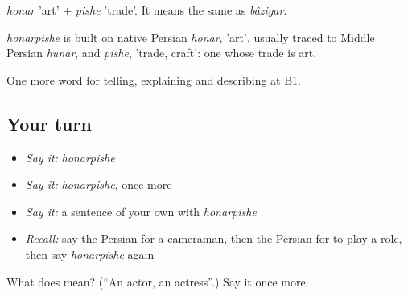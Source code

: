 \emph{honar} 'art' + \emph{pishe} 'trade'. It means the same as \emph{bâzigar}.

\begin{cousinweb}
\emph{honarpishe} is built on native Persian \emph{honar}, 'art', usually traced to Middle Persian \emph{hunar}, and \emph{pishe}, 'trade, craft': one whose trade is art.
\end{cousinweb}

\begin{grammarlens}[title={What you've built}]
One more word for telling, explaining and describing at B1.
\end{grammarlens}

\subsection*{Your turn}
\begin{itemize}
\raggedright
  \item \emph{Say it:} \emph{honarpishe}
  \item \emph{Say it:} \emph{honarpishe}, once more
  \item \emph{Say it:} a sentence of your own with \emph{honarpishe}
  \item \emph{Recall:} say the Persian for a cameraman, then the Persian for to play a role, then say \emph{honarpishe} again
\end{itemize}

\begin{tcolorbox}[breakable,colback=teal!4,colframe=teal!35!black,title={Before you move on}]
What does  mean? (\textquotedblleft{}An actor, an actress\textquotedblright{}.) Say it once more.
\end{tcolorbox}
